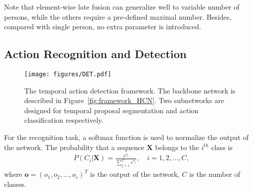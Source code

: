 \documentclass{article}
\begin{document}
Note that element-wise late fusion can generalize well to variable number of persons, while the others require a pre-defined maximal number. Besides, compared with single person, no extra parameter is introduced.

\subsection{Action Recognition and Detection}

\begin{figure*}[htbp]
  \centering
  \texttt{[image: figures/DET.pdf]}
  \caption{The temporal action detection framework. The backbone network is described in Figure~\ref{fig:framework_HCN}. Two subnetworks are designed for temporal proposal segmentation and action classification respectively.
  \label{fig:DET}}
\end{figure*}

For the recognition task, a softmax function is used to normalize the output of the network. The probability that a sequence $\bm{X}$ belongs to the $i^{th}$ class is
\begin{align}
  P(C_i|\bm{X})=\frac{e^{o_i}}{\sum_{j=1}^{C}e^{o_j}}, \quad i=1, 2, \dots, C,
\end{align}
where $\bm{o}=(o_1, o_2, \dots, o_c)^T$ is the output of the network, $C$ is the number of classes.
\end{document}
